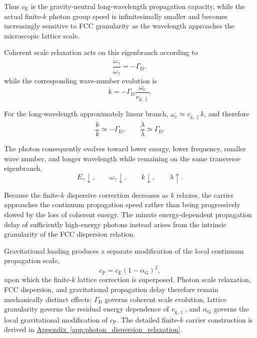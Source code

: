 Thus $c_{\mathrm E}$ is the gravity-neutral long-wavelength propagation capacity, while the actual finite-$k$ photon group speed is infinitesimally smaller and becomes increasingly sensitive to FCC granularity as the wavelength approaches the microscopic lattice scale.

Coherent scale relaxation acts on this eigenbranch according to
\begin{equation}
    \frac{\dot\omega_\gamma}{\omega_\gamma}
    =
    -\Gamma_{\mathrm D},
\end{equation}
while the corresponding wave-number evolution is
\begin{equation}
    \dot k
    =
    -\Gamma_{\mathrm D}
    \frac{\omega_{\mathrm c}}
    {v_{\mathrm g,\parallel}}.
\end{equation}

For the long-wavelength approximately linear branch,
$\omega_{\mathrm c}\simeq v_{\mathrm g,\parallel}k$,
and therefore
\begin{equation}
    \frac{\dot k}{k}
    \simeq
    -\Gamma_{\mathrm D},
    \qquad
    \frac{\dot\lambda}{\lambda}
    \simeq
    \Gamma_{\mathrm D}.
\end{equation}

The photon consequently evolves toward lower energy, lower frequency, smaller wave number, and longer wavelength while remaining on the same transverse eigenbranch,
\begin{equation}
    E_\gamma\downarrow,
    \qquad
    \omega_\gamma\downarrow,
    \qquad
    k\downarrow,
    \qquad
    \lambda\uparrow.
\end{equation}

Because the finite-$k$ dispersive correction decreases as $k$ relaxes, the carrier approaches the continuum propagation speed rather than being progressively slowed by the loss of coherent energy. The minute energy-dependent propagation delay of sufficiently high-energy photons instead arises from the intrinsic granularity of the FCC dispersion relation.

Gravitational loading produces a separate modification of the local continuum propagation scale,
\begin{equation}
    c_{\mathrm P}
    =
    c_{\mathrm E}
    (1-\alpha_{\mathrm G})^2,
\end{equation}
upon which the finite-$k$ lattice correction is superposed. Photon scale relaxation, FCC dispersion, and gravitational propagation delay therefore remain mechanically distinct effects: $\Gamma_{\mathrm D}$ governs coherent scale evolution, lattice granularity governs the residual energy dependence of $v_{\mathrm g,\parallel}$, and $\alpha_{\mathrm G}$ governs the local gravitational modification of $c_{\mathrm P}$. The detailed finite-$k$ carrier construction is derived in
\hyperref[app:photon_dispersion_relaxation]{Appendix~\ref*{app:photon_dispersion_relaxation}}.


